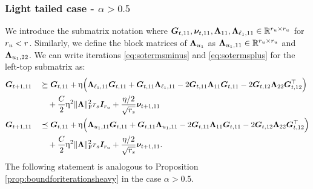 \subsubsection{Light tailed case - $\alpha > 0.5$}
We introduce the submatrix notation
where $\boldsymbol{G}_{t,11}  ,  \boldsymbol{\nu}_{t,11}  ,  \boldsymbol{\Lambda}_{11},    \boldsymbol{\Lambda}_{\ell_1, 11}    \in \mathbb{R}^{r_u \times r_u}$ for $r_u < r$. Similarly, we define the block matrices of $\boldsymbol{\Lambda}_{u_1}$ as  $\boldsymbol{\Lambda}_{u_1, 11} \in   \mathbb{R}^{r_u \times r_u}$ and  $\boldsymbol{\Lambda}_{u_1, 22}$. We can write  iterations  \eqref{eq:sotermsminus}  and  \eqref{eq:sotermsplus}  for the left-top submatrix as:
\begin{alignat}{2}
&   \boldsymbol{G}_{t+1, 11}   &&   \succeq    \boldsymbol{G}_{t,11}  +  \upeta \Big(  \boldsymbol{\Lambda}_{\ell_1,11}  \boldsymbol{G}_{t,11}   + \boldsymbol{G}_{t,11}  \boldsymbol{\Lambda}_{\ell_1,11} - 2   \boldsymbol{G}_{t,11}   \boldsymbol{\Lambda}_{11}  \boldsymbol{G}_{t,11}    -  2  \boldsymbol{G}_{t,12}    \boldsymbol{\Lambda}_{22}   \boldsymbol{G}_{t,12}^\top  \Big) \\
& \ && \quad + \frac{C}{2} \upeta^2 \lVert\boldsymbol{\Lambda}\rVert_\mathrm{F}^2 r_s \boldsymbol{I}_{r_u}  +   \frac{\eta/2}{\sqrt{r_s}} \boldsymbol{\nu}_{t+1,11}  \label{eq:sotermsminusslb}    \\
&   \boldsymbol{G}_{t+1, 11}  &&  \preceq   \boldsymbol{G}_{t,11} +  \upeta\Big(    \boldsymbol{\Lambda}_{u_1,11}  \boldsymbol{G}_{t,11}  +  \boldsymbol{G}_{t,11}  \boldsymbol{\Lambda}_{u_1,11}  - 2   \boldsymbol{G}_{t,11}    \boldsymbol{\Lambda}_{11} \boldsymbol{G}_{t,11}   - 2  \boldsymbol{G}_{t,12}   \boldsymbol{\Lambda}_{22}  \boldsymbol{G}_{t,12}^\top  \Big) \\
& \ && \quad + \frac{C}{2} \upeta^2 \lVert\boldsymbol{\Lambda}\rVert_\mathrm{F}^2 r_s \boldsymbol{I}_{r_u}    + \frac{\eta/2}{\sqrt{r_s}}   \boldsymbol{\nu}_{t+1,11}.    \label{eq:sotermsplussub}  
\end{alignat}
The following statement is analogous to Proposition \ref{prop:boundforiterationsheavy} in the case $\alpha > 0.5$.


